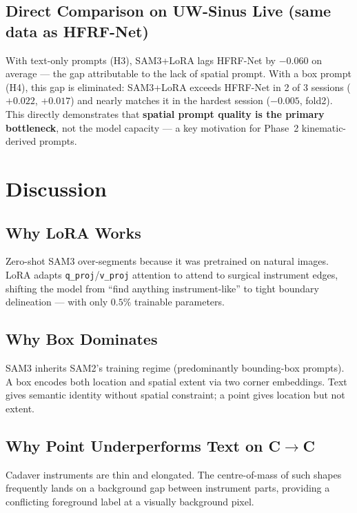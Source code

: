 \documentclass[11pt, a4paper]{article}
\begin{document}
\subsection*{Direct Comparison on UW-Sinus Live (same data as HFRF-Net)}



\noindent With text-only prompts (H3), SAM3+LoRA lags HFRF-Net by $-0.060$ on
average --- the gap attributable to the lack of spatial prompt. With a box prompt
(H4), this gap is eliminated: SAM3+LoRA exceeds HFRF-Net in 2 of 3 sessions
($+0.022$, $+0.017$) and nearly matches it in the hardest session ($-0.005$,
fold2). This directly demonstrates that \textbf{spatial prompt quality is the
primary bottleneck}, not the model capacity --- a key motivation for Phase~2
kinematic-derived prompts.

\section{Discussion}

\subsection{Why LoRA Works}
Zero-shot SAM3 over-segments because it was pretrained on natural images. LoRA
adapts \texttt{q\_proj}/\texttt{v\_proj} attention to attend to surgical instrument
edges, shifting the model from ``find anything instrument-like'' to tight boundary
delineation --- with only $0.5\%$ trainable parameters.

\subsection{Why Box Dominates}
SAM3 inherits SAM2's training regime (predominantly bounding-box prompts). A box
encodes both location and spatial extent via two corner embeddings. Text gives
semantic identity without spatial constraint; a point gives location but not extent.

\subsection{Why Point Underperforms Text on C$\to$C}
Cadaver instruments are thin and elongated. The centre-of-mass of such shapes
frequently lands on a background gap between instrument parts, providing a
conflicting foreground label at a visually background pixel.
\end{document}
